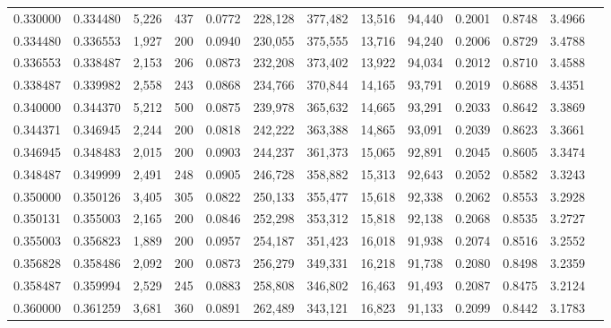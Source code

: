 \begin{tabular}{rrrrrrrrrrrrr}
0.330000 & 0.334480 & 5,226 & 437 &                                     0.0772 & 228,128 & 377,482 &  13,516 &  94,440 & 0.2001 & 0.8748 & 3.4966 \\
0.334480 & 0.336553 & 1,927 & 200 &                                     0.0940 & 230,055 & 375,555 &  13,716 &  94,240 & 0.2006 & 0.8729 & 3.4788 \\
0.336553 & 0.338487 & 2,153 & 206 &                                     0.0873 & 232,208 & 373,402 &  13,922 &  94,034 & 0.2012 & 0.8710 & 3.4588 \\
0.338487 & 0.339982 & 2,558 & 243 &                                     0.0868 & 234,766 & 370,844 &  14,165 &  93,791 & 0.2019 & 0.8688 & 3.4351 \\
0.340000 & 0.344370 & 5,212 & 500 &                                     0.0875 & 239,978 & 365,632 &  14,665 &  93,291 & 0.2033 & 0.8642 & 3.3869 \\
0.344371 & 0.346945 & 2,244 & 200 &                                     0.0818 & 242,222 & 363,388 &  14,865 &  93,091 & 0.2039 & 0.8623 & 3.3661 \\
0.346945 & 0.348483 & 2,015 & 200 &                                     0.0903 & 244,237 & 361,373 &  15,065 &  92,891 & 0.2045 & 0.8605 & 3.3474 \\
0.348487 & 0.349999 & 2,491 & 248 &                                     0.0905 & 246,728 & 358,882 &  15,313 &  92,643 & 0.2052 & 0.8582 & 3.3243 \\
0.350000 & 0.350126 & 3,405 & 305 &                                     0.0822 & 250,133 & 355,477 &  15,618 &  92,338 & 0.2062 & 0.8553 & 3.2928 \\
0.350131 & 0.355003 & 2,165 & 200 &                                     0.0846 & 252,298 & 353,312 &  15,818 &  92,138 & 0.2068 & 0.8535 & 3.2727 \\
0.355003 & 0.356823 & 1,889 & 200 &                                     0.0957 & 254,187 & 351,423 &  16,018 &  91,938 & 0.2074 & 0.8516 & 3.2552 \\
0.356828 & 0.358486 & 2,092 & 200 &                                     0.0873 & 256,279 & 349,331 &  16,218 &  91,738 & 0.2080 & 0.8498 & 3.2359 \\
0.358487 & 0.359994 & 2,529 & 245 &                                     0.0883 & 258,808 & 346,802 &  16,463 &  91,493 & 0.2087 & 0.8475 & 3.2124 \\
0.360000 & 0.361259 & 3,681 & 360 &                                     0.0891 & 262,489 & 343,121 &  16,823 &  91,133 & 0.2099 & 0.8442 & 3.1783 \\

\end{tabular}

